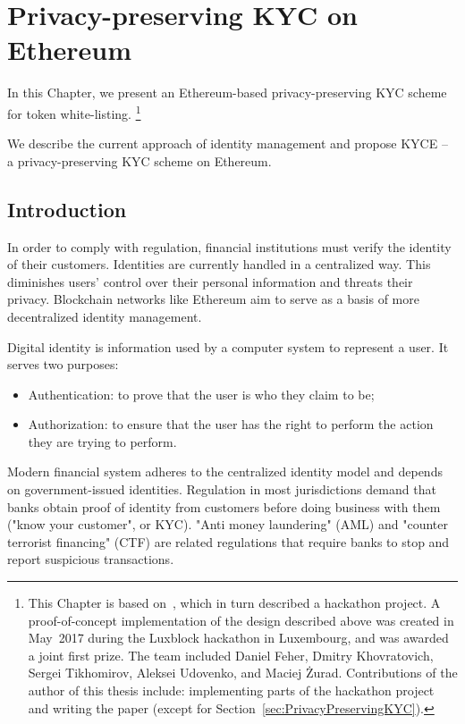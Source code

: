 \chapter{Privacy-preserving KYC on Ethereum}

\label{Chapter12KYC}

In this Chapter, we present an Ethereum-based privacy-preserving KYC scheme for token white-listing.
\footnote{This Chapter is based on~\cite{Biryukov2018}, which in turn described a hackathon project. A proof-of-concept implementation of the design described above was created in May~2017 during the Luxblock hackathon in Luxembourg, and was awarded a joint first prize. The team included Daniel Feher, Dmitry Khovratovich, Sergei Tikhomirov, Aleksei Udovenko, and Maciej \.{Z}urad. Contributions of the author of this thesis include: implementing parts of the hackathon project and writing the paper (except for Section~\ref{sec:PrivacyPreservingKYC}).}

We describe the current approach of identity management and propose KYCE -- a privacy-preserving KYC scheme on Ethereum.



\section{Introduction}

In order to comply with regulation, financial institutions must verify the identity of their customers.
Identities are currently handled in a centralized way.
This diminishes users' control over their personal information and threats their privacy.
Blockchain networks like Ethereum aim to serve as a basis of more decentralized identity management.

Digital identity is information used by a computer system to represent a user.
It serves two purposes:

\begin{itemize}
	\item Authentication: to prove that the user is who they claim to be;
	\item Authorization: to ensure that the user has the right to perform the action they are trying to perform.
\end{itemize}

Modern financial system adheres to the centralized identity model and depends on government-issued identities.
Regulation in most jurisdictions demand that banks obtain proof of identity from customers before doing business with them ("know your customer", or KYC).
"Anti money laundering" (AML) and "counter terrorist financing" (CTF) are related regulations that require banks to stop and report suspicious transactions.

